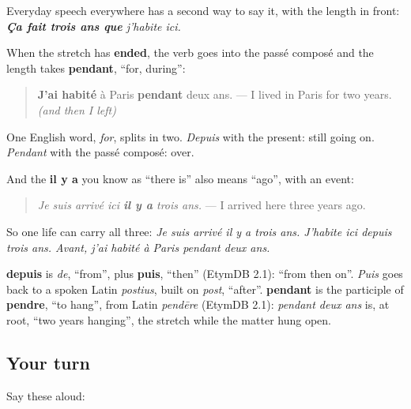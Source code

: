 Everyday speech everywhere has a second way to say it, with the length in front: \emph{\textbf{Ça fait trois ans que} j'habite ici.}

\begin{grammarlens}[title={Grammar Lens: pendant, and il y a}]
When the stretch has \textbf{ended}, the verb goes into the passé composé and the length takes \textbf{pendant}, \textquotedblleft{}for, during\textquotedblright{}:

\begin{quote}
\textbf{J'ai habité} à Paris \textbf{pendant} deux ans. — I lived in Paris for two years. \emph{(and then I left)}
\end{quote}

One English word, \emph{for}, splits in two. \emph{Depuis} with the present: still going on. \emph{Pendant} with the passé composé: over.

And the \textbf{il y a} you know as \textquotedblleft{}there is\textquotedblright{} also means \textquotedblleft{}ago\textquotedblright{}, with an event:

\begin{quote}
\emph{Je suis arrivé ici \textbf{il y a} trois ans.} — I arrived here three years ago.
\end{quote}

So one life can carry all three: \emph{Je suis arrivé il y a trois ans. J'habite ici depuis trois ans. Avant, j'ai habité à Paris pendant deux ans.}
\end{grammarlens}

\begin{cousinweb}
\textbf{depuis} is \emph{de}, \textquotedblleft{}from\textquotedblright{}, plus \textbf{puis}, \textquotedblleft{}then\textquotedblright{} (EtymDB 2.1): \textquotedblleft{}from then on\textquotedblright{}. \emph{Puis} goes back to a spoken Latin \emph{postius}, built on \emph{post}, \textquotedblleft{}after\textquotedblright{}. \textbf{pendant} is the participle of \textbf{pendre}, \textquotedblleft{}to hang\textquotedblright{}, from Latin \emph{pendēre} (EtymDB 2.1): \emph{pendant deux ans} is, at root, \textquotedblleft{}two years hanging\textquotedblright{}, the stretch while the matter hung open.
\end{cousinweb}

\subsection*{Your turn}
Say these aloud:

